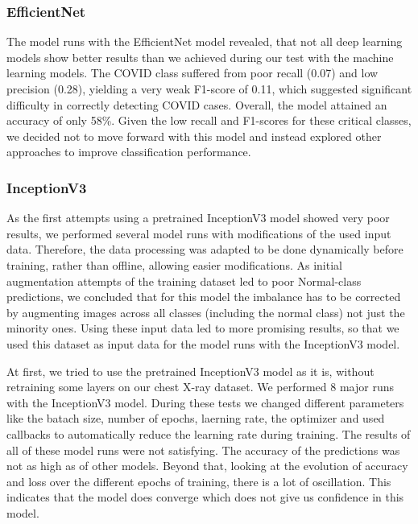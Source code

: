 \documentclass{article}
\begin{document}
\subsubsection{EfficientNet} 
The model runs with the EfficientNet model revealed, that not all deep learning models show better results than we achieved during our test with the machine learning models. 
The COVID class suffered from poor recall (0.07) and low precision (0.28), yielding a very weak F1-score of 0.11, which suggested significant difficulty in correctly detecting COVID cases. Overall, the model attained an accuracy of only 58\%. Given the low recall and F1-scores for these critical classes, we decided not to move forward with this model and instead explored other approaches to improve classification performance.


\subsubsection{InceptionV3} \label{section:InceptionV3}

As the first attempts using a pretrained InceptionV3 model showed very poor results, we performed several model runs with modifications of the used input data. Therefore, the data processing was adapted to be done dynamically before training, rather than offline, allowing easier modifications. As initial augmentation attempts of the training dataset led to poor Normal-class predictions, we concluded that for this model the imbalance has to be corrected by augmenting images across all classes (including the normal class) not just the minority ones. Using these input data led to more promising results, so that we used this dataset as input data for the model runs with the InceptionV3 model. 

At first, we tried to use the pretrained InceptionV3 model as it is, without retraining some layers on our chest X-ray dataset. We performed 8 major runs with the InceptionV3 model. During these tests we changed different parameters like the batach size, number of epochs, laerning rate, the optimizer and used callbacks to automatically reduce the learning rate during training. The results of all of these model runs were not satisfying. The accuracy of the predictions was not as high as of other models. Beyond that, looking at the evolution of accuracy and loss over the different epochs of training, there is a lot of oscillation. This indicates that the model does converge which does not give us confidence in this model. 
\end{document}
